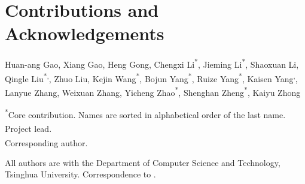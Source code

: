 \section{Contributions and Acknowledgements}

%
Huan-ang Gao, Xiang Gao, Heng Gong, Chengxi Li\textsuperscript{*},
Jieming Li\textsuperscript{*}, Shaoxuan Li, Qingle Liu\textsuperscript{*,\dag},
Zhuo Liu, Kejin Wang\textsuperscript{*}, Bojun Yang\textsuperscript{*},
Ruize Yang\textsuperscript{*}, Kaisen Yang\textsuperscript{\dag,\ddag},
Lanyue Zhang, Weixuan Zhang, Yicheng Zhao\textsuperscript{*},
Shenghan Zheng\textsuperscript{*}, Kaiyu Zhong

\vspace{0.5em}
\noindent\textsuperscript{*}Core contribution. Names are sorted in alphabetical
order of the last name.\\
\textsuperscript{\dag}Project lead.\\
\textsuperscript{\ddag}Corresponding author.

\vspace{0.5em}
\noindent All authors are with the Department of Computer Science and Technology,
Tsinghua University. Correspondence to
.

